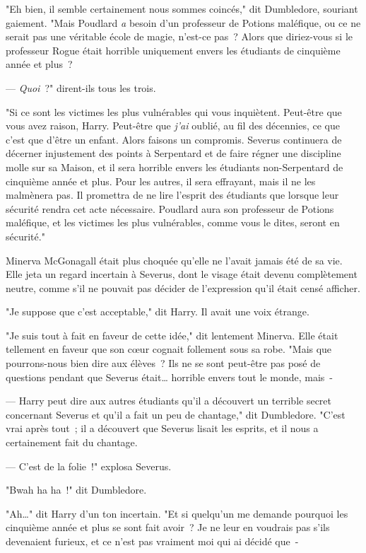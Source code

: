 "Eh bien, il semble certainement nous sommes coincés," dit Dumbledore, souriant gaiement. "Mais Poudlard \emph{a} besoin d'un professeur de Potions maléfique, ou ce ne serait pas une véritable école de magie, n'est-ce pas~? Alors que diriez-vous si le professeur Rogue était horrible uniquement envers les étudiants de cinquième année et plus~?

--- \emph{Quoi}~?" dirent-ils tous les trois.

"Si ce sont les victimes les plus vulnérables qui vous inquiètent. Peut-être que vous avez raison, Harry. Peut-être que \emph{j'ai} oublié, au fil des décennies, ce que c'est que d'être un enfant. Alors faisons un compromis. Severus continuera de décerner injustement des points à Serpentard et de faire régner une discipline molle sur sa Maison, et il sera horrible envers les étudiants non-Serpentard de cinquième année et plus. Pour les autres, il sera effrayant, mais il ne les malmènera pas. Il promettra de ne lire l'esprit des étudiants que lorsque leur sécurité rendra cet acte nécessaire. Poudlard aura son professeur de Potions maléfique, et les victimes les plus vulnérables, comme vous le dites, seront en sécurité."

Minerva McGonagall était plus choquée qu'elle ne l'avait jamais été de sa vie. Elle jeta un regard incertain à Severus, dont le visage était devenu complètement neutre, comme s'il ne pouvait pas décider de l'expression qu'il était censé afficher.

"Je suppose que c'est acceptable," dit Harry. Il avait une voix étrange.

"Je suis tout à fait en faveur de cette idée," dit lentement Minerva. Elle était tellement en faveur que son cœur cognait follement sous sa robe. "Mais que pourrons-nous bien dire aux élèves~? Ils ne se sont peut-être pas posé de questions pendant que Severus était… horrible envers tout le monde, mais~-

--- Harry peut dire aux autres étudiants qu'il a découvert un terrible secret concernant Severus et qu'il a fait un peu de chantage," dit Dumbledore. "C'est vrai après tout~; il a découvert que Severus lisait les esprits, et il nous a certainement fait du chantage.

--- C'est de la folie~!" explosa Severus.

"Bwah ha ha~!" dit Dumbledore.

"Ah…" dit Harry d'un ton incertain. "Et si quelqu'un me demande pourquoi les cinquième année et plus se sont fait avoir~? Je ne leur en voudrais pas s'ils devenaient furieux, et ce n'est pas vraiment moi qui ai décidé que~-

